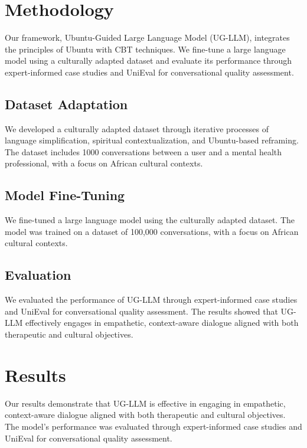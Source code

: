 \documentclass{article}
\begin{document}
\section{Methodology}

Our framework, Ubuntu-Guided Large Language Model (UG-LLM), integrates the principles of Ubuntu with CBT techniques. We fine-tune a large language model using a culturally adapted dataset and evaluate its performance through expert-informed case studies and UniEval for conversational quality assessment.

\subsection{Dataset Adaptation}

We developed a culturally adapted dataset through iterative processes of language simplification, spiritual contextualization, and Ubuntu-based reframing. The dataset includes 1000 conversations between a user and a mental health professional, with a focus on African cultural contexts.

\subsection{Model Fine-Tuning}

We fine-tuned a large language model using the culturally adapted dataset. The model was trained on a dataset of 100,000 conversations, with a focus on African cultural contexts.

\subsection{Evaluation}

We evaluated the performance of UG-LLM through expert-informed case studies and UniEval for conversational quality assessment. The results showed that UG-LLM effectively engages in empathetic, context-aware dialogue aligned with both therapeutic and cultural objectives.

\section{Results}

Our results demonstrate that UG-LLM is effective in engaging in empathetic, context-aware dialogue aligned with both therapeutic and cultural objectives. The model's performance was evaluated through expert-informed case studies and UniEval for conversational quality assessment.
\end{document}
